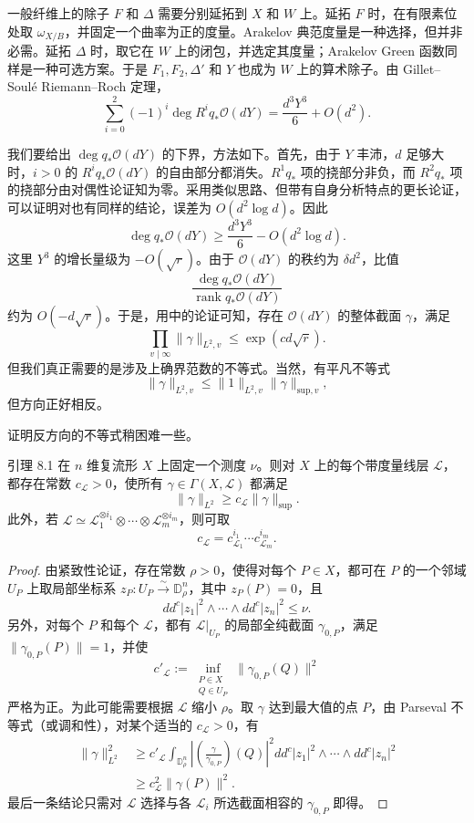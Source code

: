 一般纤维上的除子 $F$ 和 $\Delta$ 需要分别延拓到 $X$ 和 $W$ 上。延拓 $F$ 时，在有限素位处取 $\omega_{X/B}$，并固定一个曲率为正的度量。Arakelov 典范度量是一种选择，但并非必需。延拓 $\Delta$ 时，取它在 $W$ 上的闭包，并选定其度量；Arakelov Green 函数同样是一种可选方案。于是 $F_1,F_2,\Delta'$ 和 $Y$ 也成为 $W$ 上的算术除子。由 Gillet--Soulé Riemann--Roch 定理，
\[
\sum_{i=0}^2(-1)^i\deg R^iq_*\mathcal O(dY)
=\frac{d^3Y^3}{6}+O(d^2).
\]

我们要给出 $\deg q_*\mathcal O(dY)$ 的下界，方法如下。首先，由于 $Y$ 丰沛，$d$ 足够大时，$i>0$ 的 $R^iq_*\mathcal O(dY)$ 的自由部分都消失。$R^1q_*$ 项的挠部分非负，而 $R^2q_*$ 项的挠部分由对偶性论证知为零。采用类似思路、但带有自身分析特点的更长论证，可以证明对也有同样的结论，误差为 $O(d^2\log d)$。因此
\[
\deg q_*\mathcal O(dY)\ge\frac{d^3Y^3}{6}-O(d^2\log d).
\]
这里 $Y^3$ 的增长量级为 $-O(\sqrt r)$。由于 $\mathcal O(dY)$ 的秩约为 $\delta d^2$，比值
\[
\frac{\deg q_*\mathcal O(dY)}{\operatorname{rank}q_*\mathcal O(dY)}
\]
约为 $O(-d\sqrt r)$。于是，用中的论证可知，存在 $\mathcal O(dY)$ 的整体截面 $\gamma$，满足
\[
\prod_{v\mid\infty}\|\gamma\|_{L^2,v}\le\exp(cd\sqrt r).
\]
但我们真正需要的是涉及上确界范数的不等式。当然，有平凡不等式
\[
\|\gamma\|_{L^2,v}\le\|1\|_{L^2,v}\|\gamma\|_{\mathrm{sup},v},
\]
但方向正好相反。

证明反方向的不等式稍困难一些。
\begin{statement}{引理 8.1}
在 $n$ 维复流形 $X$ 上固定一个测度 $\nu$。则对 $X$ 上的每个带度量线层 $\mathscr L$，都存在常数 $c_{\mathscr L}>0$，使所有 $\gamma\in\Gamma(X,\mathscr L)$ 都满足
\[
\|\gamma\|_{L^2}\ge c_{\mathscr L}\|\gamma\|_{\mathrm{sup}}.
\]
此外，若 $\mathscr L\simeq\mathscr L_1^{\otimes i_1}\otimes\cdots\otimes\mathscr L_m^{\otimes i_m}$，则可取
\[
c_{\mathscr L}=c_{\mathscr L_1}^{i_1}\cdots c_{\mathscr L_m}^{i_m}.
\]
\end{statement}
\begin{proof}
由紧致性论证，存在常数 $\rho>0$，使得对每个 $P\in X$，都可在 $P$ 的一个邻域 $U_P$ 上取局部坐标系 $z_P:U_P\xrightarrow\sim\mathbb D_\rho^n$，其中 $z_P(P)=0$，且
\[
dd^c|z_1|^2\wedge\cdots\wedge dd^c|z_n|^2\le\nu.
\]
另外，对每个 $P$ 和每个 $\mathscr L$，都有 $\mathscr L|_{U_P}$ 的局部全纯截面 $\gamma_{0,P}$，满足 $\|\gamma_{0,P}(P)\|=1$，并使
\[
c'_{\mathscr L}:=\inf_{\substack{P\in X\\Q\in U_P}}\|\gamma_{0,P}(Q)\|^2
\]
严格为正。为此可能需要根据 $\mathscr L$ 缩小 $\rho$。取 $\gamma$ 达到最大值的点 $P$，由 Parseval 不等式（或调和性），对某个适当的 $c_{\mathscr L}>0$，有
\begin{align*}
\|\gamma\|_{L^2}^2
&\ge c'_{\mathscr L}\int_{\mathbb D_\rho^n}
\left|\left(\frac\gamma{\gamma_{0,P}}\right)(Q)\right|^2
 dd^c|z_1|^2\wedge\cdots\wedge dd^c|z_n|^2\\
&\ge c_{\mathscr L}^2\|\gamma(P)\|^2.
\end{align*}
最后一条结论只需对 $\mathscr L$ 选择与各 $\mathscr L_i$ 所选截面相容的 $\gamma_{0,P}$ 即得。
\end{proof}

